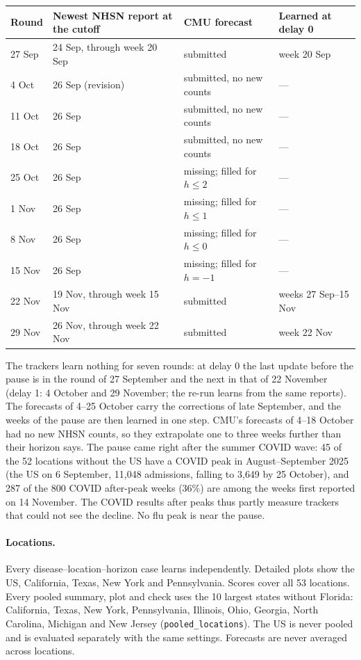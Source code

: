 \documentclass[11pt,a4paper]{article}
\theoremstyle{definition}
\theoremstyle{remark}
\begin{document}
\begin{center}\small
\begin{tabular}{@{}llll@{}}
\toprule
Round & Newest NHSN report at the cutoff & CMU forecast & Learned at delay 0\\
\midrule
27 Sep & 24 Sep, through week 20 Sep & submitted & week 20 Sep\\
4 Oct  & 26 Sep (revision) & submitted, no new counts & ---\\
11 Oct & 26 Sep & submitted, no new counts & ---\\
18 Oct & 26 Sep & submitted, no new counts & ---\\
25 Oct & 26 Sep & missing; filled for $h\le2$ & ---\\
1 Nov  & 26 Sep & missing; filled for $h\le1$ & ---\\
8 Nov  & 26 Sep & missing; filled for $h\le0$ & ---\\
15 Nov & 26 Sep & missing; filled for $h=-1$ & ---\\
22 Nov & 19 Nov, through week 15 Nov & submitted & weeks 27 Sep--15 Nov\\
29 Nov & 26 Nov, through week 22 Nov & submitted & week 22 Nov\\
\bottomrule
\end{tabular}
\end{center}

The trackers learn nothing for seven rounds: at delay 0 the last update
before the pause is in the round of 27 September and the next in that of
22 November (delay 1: 4 October and 29 November; the re-run learns from
the same reports). The forecasts of 4--25 October carry the corrections of
late September, and the weeks of the pause are then learned in one step.
CMU's forecasts of 4--18 October had no new NHSN counts, so they
extrapolate one to three weeks further than their horizon says. The pause
came right after the summer COVID wave: 45 of the 52 locations without the
US have a COVID peak in August--September 2025 (the US on 6 September,
11{,}048 admissions, falling to 3{,}649 by 25 October), and 287 of the 800
COVID after-peak weeks (36\%) are among the weeks first reported on 14
November. The COVID results after peaks thus partly measure trackers that
could not see the decline. No flu peak is near the pause.

\paragraph{Locations.}
Every disease--location--horizon case learns independently. Detailed
plots show the US, California, Texas, New York and Pennsylvania.
Scores cover all 53 locations. Every pooled summary, plot and check uses
the 10 largest states without Florida: California, Texas, New York,
Pennsylvania, Illinois, Ohio, Georgia, North Carolina, Michigan and New
Jersey (\texttt{pooled\_locations}). The US is never pooled and is
evaluated separately with the same settings. Forecasts are never averaged
across locations.
\end{document}

